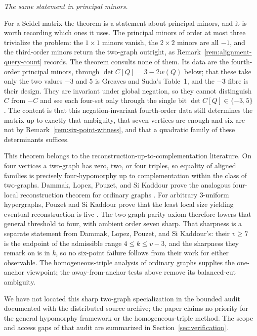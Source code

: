 \smallskip
\noindent\emph{The same statement in principal minors.}\par
For a Seidel matrix the theorem is a statement about principal minors, and it
is worth recording which ones it uses.  The principal minors of order at most three trivialize the
problem: the \(1\times1\) minors vanish, the \(2\times2\) minors are all
\(-1\), and the third-order minors return the two-graph outright, as
Remark~\ref{rem:alignment-query-count} records.  The theorem consults none of
them.  Its data are the fourth-order principal minors, through
\(\det C[Q]=3-2w(Q)\) below; that these take only the two values \(-3\) and
\(5\) is Greaves and Suda's Table~1, and the \(-3\) fibre is their design.
They are invariant under global negation, so they cannot distinguish \(C\)
from \(-C\) and see each four-set only through the single bit
\(\det C[Q]\in\{-3,5\}\).  The content is that this negation-invariant
fourth-order data still determines the matrix up to exactly that ambiguity,
that seven vertices are enough and six are not by
Remark~\ref{rem:six-point-witness}, and that a quadratic family of these
determinants suffices.

This theorem belongs to the reconstruction-up-to-complementation literature.
On four vertices a two-graph has zero, two, or four triples, so equality of
aligned families is precisely four-hypomorphy up to complementation within the
class of two-graphs.  Dammak, Lopez, Pouzet, and Si Kaddour prove the analogous
four-local reconstruction theorem for ordinary graphs
\cite{DammakGraphHypomorphy}.  For arbitrary \(3\)-uniform hypergraphs,
Pouzet and Si Kaddour prove that the least local size yielding eventual
reconstruction is five \cite{PouzetHypergraphIsomorphy}.  The two-graph parity
axiom therefore lowers that general threshold to four, with ambient order
seven sharp.  That sharpness is a separate statement from Dammak, Lopez,
Pouzet, and Si Kaddour's: their \(v\ge7\) is the endpoint of the admissible
range \(4\le k\le v-3\), and the sharpness they remark on is in \(k\), so no
six-point failure follows from their work for either observable.
The homogeneous-triple analysis of ordinary graphs
\cite{PouzetHomogeneousTriples} supplies the one-anchor viewpoint; the
away-from-anchor tests above remove its balanced-cut ambiguity.

We have not located this sharp two-graph specialization in the bounded audit
documented with the distributed source archive; the paper claims no priority
for the general hypomorphy framework or the homogeneous-triple method.  The
scope and access gaps of that audit are summarized in
Section~\ref{sec:verification}.

